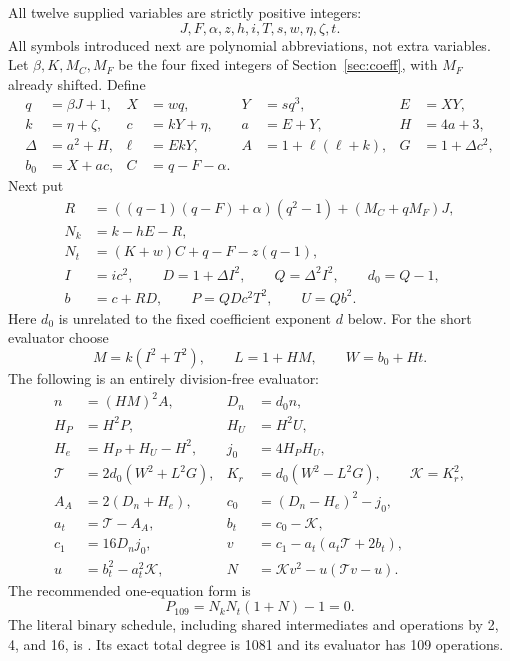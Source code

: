 \documentclass[11pt]{article}
\begin{document}
All twelve supplied variables are strictly positive integers:
\[
 J,F,\alpha,z,h,i,T,s,w,\eta,\zeta,t.
\]
All symbols introduced next are polynomial abbreviations, not extra variables.
Let $\beta,K,M_C,M_F$ be the four fixed integers of
Section~\ref{sec:coeff}, with $M_F$ already shifted. Define
\begin{align*}
 q&=\beta J+1,& X&=wq,&Y&=sq^3,&E&=XY,\\
 k&=\eta+\zeta,&c&=kY+\eta,&a&=E+Y,&H&=4a+3,\\
 \Delta&=a^2+H,&\ell&=EkY,&A&=1+\ell(\ell+k),&G&=1+\Delta c^2,\\
 b_0&=X+ac,&C&=q-F-\alpha.
\end{align*}
Next put
\begin{align*}
 R&=((q-1)(q-F)+\alpha)(q^2-1)+(M_C+qM_F)J,\\
 N_k&=k-hE-R,\\
 N_t&=(K+w)C+q-F-z(q-1),\\
 I&=ic^2,\qquad D=1+\Delta I^2,\qquad Q=\Delta^2I^2,
 \qquad d_0=Q-1,\\
 b&=c+RD,\qquad P=QD c^2T^2,\qquad U=Qb^2.
\end{align*}
Here $d_0$ is unrelated to the fixed coefficient exponent $d$ below. For the
short evaluator choose
\[
 M=k(I^2+T^2),\qquad L=1+HM,\qquad W=b_0+Ht.
\]
The following is an entirely division-free evaluator:
\begin{align*}
 n&=(HM)^2A,&D_n&=d_0 n,\\
 H_P&=H^2P,&H_U&=H^2U,\\
 H_e&=H_P+H_U-H^2,&j_0&=4H_PH_U,\\
 \mathcal T&=2d_0(W^2+L^2G),&
 K_r&=d_0(W^2-L^2G),\qquad \mathcal K=K_r^2,\\
 A_A&=2(D_n+H_e),&c_0&=(D_n-H_e)^2-j_0,\\
 a_t&=\mathcal T-A_A,&b_t&=c_0-\mathcal K,\\
 c_1&=16D_nj_0,&
 v&=c_1-a_t(a_t\mathcal T+2b_t),\\
 u&=b_t^2-a_t^2\mathcal K,&
 N&=\mathcal K v^2-u(\mathcal T v-u).
\end{align*}
The recommended one-equation form is
\begin{equation}\boxed{\quad P_{109}=N_kN_t(1+N)-1=0.\quad}\label{eq:p109}
\end{equation}
The literal binary schedule, including shared intermediates and operations by
2, 4, and 16, is .
Its exact total degree is 1081 and its evaluator has 109 operations.
\end{document}
